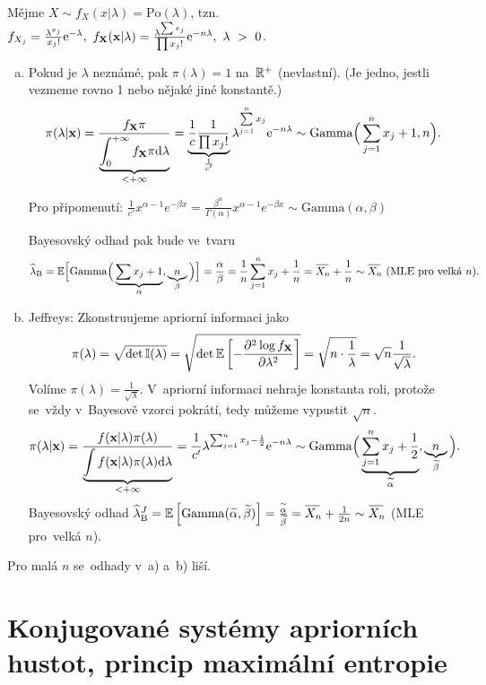 \begin{example}
	Mějme $X\sim f_X(x|\lambda)=\mathrm{Po}(\lambda)$, tzn. $f_{X_j}=\frac{\lambda^{x_j}}{x_j!}\mathrm{e}^{-\lambda},~f_\textbf{X}(\textbf{x}|\lambda)=\frac{\lambda^{\sum x_j}}{\prod x_j!}\mathrm{e}^{-n\lambda},~\lambda~>~0$.\begin{enumerate}[a)]
		\item Pokud je $\lambda$ neznámé, pak $\pi(\lambda)=1$ na~$\mathbb{R}^+$ (nevlastní). (Je jedno, jestli vezmeme rovno 1 nebo nějaké jiné konstantě.)
		$$
		\pi(\lambda|\textbf{x})=\frac{f_{\textbf{X}} \pi}{\underbrace{\int_{0}^{+\infty}f_{\textbf{X}}\pi\mathrm{d}\lambda}_{<+\infty}}=\underbrace{\frac{1}{c}\frac{1}{\prod x_j!}}_{\frac{1}{c'}}\lambda^{\sum\limits_{j=1}^{n} x_j}\mathrm{e}^{-n\lambda}\sim\mathrm{Gamma}\Big(\sum\limits_{j=1}^{n} x_j+1,n\Big).$$
		
		Pro připomenutí: $\frac{1}{c'}x^{\alpha-1}e^{-\beta x}=\frac{\beta^{\alpha}}{\Gamma(\alpha)}x^{\alpha-1}e^{-\beta x } \sim \mathrm{Gamma}(\alpha,\beta) $
		
		Bayesovský odhad pak bude ve~tvaru
		$$\widehat{\lambda}_\mathrm{B}=\E\Big[\mathrm{Gamma}\Big(\underbrace{\sum x_j+1}_{\alpha},\underbrace{n}_\beta\Big)\Big]=\frac{\alpha}{\beta}=\frac{1}{n}\sumjn x_j+\frac{1}{n}=\Oxn+\frac{1}{n}\sim \Oxn~(\text{MLE pro~velká }n).$$
		\item Jeffreys: Zkonstruujeme apriorní informaci jako $$\pi(\lambda)=\sqrt{\det \mathbb{I}(\lambda)}=\sqrt{\det \mathbb{E}\left[ -\frac{\partial^2\log f_{\textbf{X}}}{\partial\lambda^2} \right]}=\sqrt{n\cdot\frac{1}{\lambda}}=\sqrt{n}\frac{1}{\sqrt{\lambda}}.$$
		Volíme $\pi(\lambda)=\frac{1}{\sqrt{\lambda}}$. V~apriorní informaci nehraje konstanta roli, protože se~vždy v~Bayesově vzorci pokrátí, tedy můžeme vypustit $\sqrt{n}$.
		$$ \pi(\lambda|\textbf{x})=\frac{f(\textbf{x}|\lambda) \pi(\lambda)}{\underbrace{\int f(\textbf{x}|\lambda)\pi(\lambda)\mathrm{d}\lambda}_{<+\infty}}=\frac{1}{c'}\lambda^{\sum_{j=1}^n x_j-\frac{1}{2}}\mathrm{e}^{-n\lambda}\sim\mathrm{Gamma}\Big(\underbrace{\sum\limits_{j=1}^{n} x_j+\frac{1}{2}}_{\widetilde{\alpha}},\underbrace{n}_{\widetilde{\beta}}\Big).$$
		Bayesovský odhad $\widehat{\lambda}_\mathrm{B}^J=\EE{\mathrm{Gamma}(\widetilde{\alpha},\widetilde{\beta})}=\frac{\widetilde{\alpha}}{\widetilde{\beta}}=\Oxn+\frac{1}{2n}\sim\Oxn$ (MLE pro~velká $n$).
	\end{enumerate}
	Pro malá $n$ se~odhady v~a) a~b) liší.
\end{example}

\chapter{Konjugované systémy apriorních hustot, princip maximální entropie}

